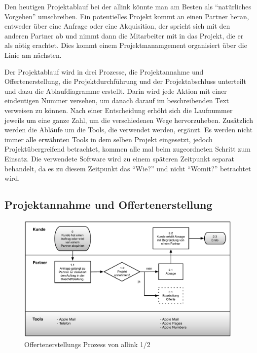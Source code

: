 Den heutigen Projektablauf bei der allink könnte man am Besten als ``natürliches Vorgehen''
umschreiben. Ein potentielles Projekt kommt an einen Partner heran, entweder über 
eine Anfrage oder eine Akquisition, der spricht sich mit den anderen Partner ab 
und nimmt dann die Mitarbeiter mit in das Projekt, die er als nötig erachtet.
Dies kommt einem Projektmanamgement organisiert über die Linie am nächsten.

Der Projektablauf wird in drei Prozesse, die Projektannahme und Offertenerstellung,
die Projektdurchführung und der Projektabschluss unterteilt und dazu die 
Ablaufdiagramme erstellt. Darin wird jede Aktion mit einer eindeutigen Nummer versehen,
um danach darauf im beschreibenden Text verweisen zu können. Nach einer Entscheidung erhöht
sich die Laufnummer jeweils um eine ganze Zahl, um die verschiedenen Wege hervorzuheben.
Zusätzlich werden die Abläufe um die Tools, die verwendet werden, ergänzt.
Es werden nicht immer alle erwähnten Tools in dem selben Projekt eingesetzt,
jedoch Projektübergreifend betrachtet, kommen alle mal beim zugeordneten Schritt 
zum Einsatz. Die verwendete Software wird zu einem späteren Zeitpunkt separat
behandelt, da es zu diesem Zeitpunkt das ``Wie?'' und nicht ``Womit?'' betrachtet
wird.

\clearpage

\subsection{Projektannahme und Offertenerstellung}

\begin{figure}[p]
\begin{center}
\includegraphics[width=0.99\textwidth,angle=0]{./bilder/analyse/01_ist_prozesse_offerte_01.pdf}
\caption[Offertenerstellungs Prozess von allink 1/2]{Offertenerstellungs 
    Prozess von allink 1/2\footnotemark}
\label{pic:01_ist_prozesse_offerte_01}
\end{center}
\end{figure}

